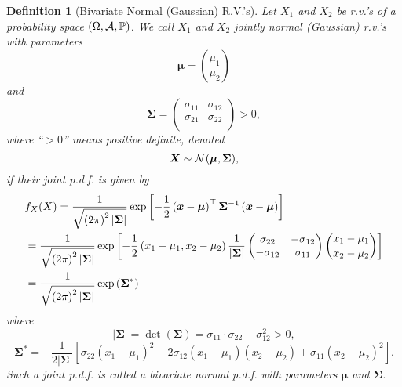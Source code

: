 \documentclass[openany,12pt]{book}
\newtheorem{definition}{Definition}[chapter]
\begin{document}
\begin{definition}[Bivariate Normal (Gaussian) R.V.'s]
Let $X_{1}$ and $X_{2}$ be r.v.'s of a probability space $(\Omega,\mathcal{A},\mathbb{P})$. We call $X_{1}$ and $X_{2}$ jointly normal (Gaussian) r.v.'s with parameters
\[\bm{\mu}=\binom{\mu_{1}}{\mu_{2}}\]
and
\[\bm{\Sigma} = \begin{pmatrix}
\sigma_{11} & \sigma_{12} \\
\sigma_{21} & \sigma_{22} \\
\end{pmatrix} > 0,\]
where ``$>0$'' means positive definite, denoted \[\bm{X}\sim \mathcal{N}(\bm{\mu},\bm{\Sigma}),\] if their joint p.d.f. is given by
\[\begin{aligned}
&f_{X}(X) = \frac{1}{\sqrt{{(2\pi)}^{2}\left|\bm{\Sigma}\right|}}\exp\left[ - \frac{1}{2}\left(\bm{x} -\bm{\mu} \right)^{\top}\bm{\Sigma}_{}^{-1}\left( \bm{x}-\bm{\mu} \right) \right]\\
&= \frac{1}{\sqrt{{(2\pi)}^{2}\left|\bm{\Sigma}\right|}}\exp\left[ - \frac{1}{2}\left( x_{1} - \mu_{1}, x_{2} - \mu_{2} \right)\frac{1}{\left| \bm{\Sigma} \right|}\begin{pmatrix}
\sigma_{22} & {- \sigma}_{12} \\
  - \sigma_{12} & \sigma_{11} \\
\end{pmatrix} \binom{x_{1} - \mu_{1}}{x_{2} - \mu_{2}} \right]\\
&= \frac{1}{\sqrt{{(2\pi)}^{2}\left|\bm{\Sigma}\right|}}\exp\left(\bm{\Sigma}_{}^* \right)
\end{aligned}\]
where
\[\left|\bm{\Sigma}\right| = \det\left( \bm{\Sigma} \right) = \sigma_{11} \cdot \sigma_{22} - \sigma_{12}^{2} > 0,\]
\[\bm{\Sigma}_{}^*=- \frac{1}{2\left| \bm{\Sigma} \right|}\left[ \sigma_{22}\left( x_{1} - \mu_{1} \right)^{2} - 2\sigma_{12}\left( x_{1} - \mu_{1} \right)\left( x_{2} - \mu_{2} \right) + \sigma_{11}\left( x_{2} - \mu_{2} \right)^{2} \right].\]
Such a joint p.d.f. is called a bivariate normal p.d.f. with parameters
$\bm{\mu}$ and $\bm{\Sigma}$.
\end{definition}
\end{document}
